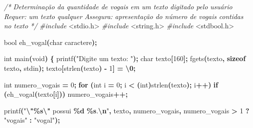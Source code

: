 \documentclass[
  11pt,
  a4paper,
]{scrbook}
\newenvironment{Shaded}{\begin{snugshade}}{\end{snugshade}}
\newcommand{\CharTok}[1]{\textcolor[rgb]{0.31,0.60,0.02}{#1}}
\newcommand{\CommentTok}[1]{\textcolor[rgb]{0.56,0.35,0.01}{\textit{#1}}}
\newcommand{\ControlFlowTok}[1]{\textcolor[rgb]{0.13,0.29,0.53}{\textbf{#1}}}
\newcommand{\DataTypeTok}[1]{\textcolor[rgb]{0.13,0.29,0.53}{#1}}
\newcommand{\DecValTok}[1]{\textcolor[rgb]{0.00,0.00,0.81}{#1}}
\newcommand{\ImportTok}[1]{#1}
\newcommand{\KeywordTok}[1]{\textcolor[rgb]{0.13,0.29,0.53}{\textbf{#1}}}
\newcommand{\NormalTok}[1]{#1}
\newcommand{\OperatorTok}[1]{\textcolor[rgb]{0.81,0.36,0.00}{\textbf{#1}}}
\newcommand{\PreprocessorTok}[1]{\textcolor[rgb]{0.56,0.35,0.01}{\textit{#1}}}
\newcommand{\SpecialCharTok}[1]{\textcolor[rgb]{0.81,0.36,0.00}{\textbf{#1}}}
\newcommand{\StringTok}[1]{\textcolor[rgb]{0.31,0.60,0.02}{#1}}
\begin{document}
\begin{Shaded}
\begin{Highlighting}[]
\CommentTok{/*}
\CommentTok{Determinação da quantidade de vogais em um texto digitado pelo usuário}
\CommentTok{Requer: um texto qualquer}
\CommentTok{Assegura: apresentação do número de vogais contidas no texto}
\CommentTok{*/}
\PreprocessorTok{\#include }\ImportTok{\textless{}stdio.h\textgreater{}}
\PreprocessorTok{\#include }\ImportTok{\textless{}string.h\textgreater{}}
\PreprocessorTok{\#include }\ImportTok{\textless{}stdbool.h\textgreater{}}

\DataTypeTok{bool}\NormalTok{ eh\_vogal}\OperatorTok{(}\DataTypeTok{char}\NormalTok{ caractere}\OperatorTok{);}

\DataTypeTok{int}\NormalTok{ main}\OperatorTok{(}\DataTypeTok{void}\OperatorTok{)} \OperatorTok{\{}
\NormalTok{    printf}\OperatorTok{(}\StringTok{"Digite um texto: "}\OperatorTok{);}
    \DataTypeTok{char}\NormalTok{ texto}\OperatorTok{[}\DecValTok{160}\OperatorTok{];}
\NormalTok{    fgets}\OperatorTok{(}\NormalTok{texto}\OperatorTok{,} \KeywordTok{sizeof}\NormalTok{ texto}\OperatorTok{,}\NormalTok{ stdin}\OperatorTok{);}
\NormalTok{    texto}\OperatorTok{[}\NormalTok{strlen}\OperatorTok{(}\NormalTok{texto}\OperatorTok{)} \OperatorTok{{-}} \DecValTok{1}\OperatorTok{]} \OperatorTok{=} \CharTok{\textquotesingle{}}\SpecialCharTok{\textbackslash{}0}\CharTok{\textquotesingle{}}\OperatorTok{;}

    \DataTypeTok{int}\NormalTok{ numero\_vogais }\OperatorTok{=} \DecValTok{0}\OperatorTok{;}
    \ControlFlowTok{for} \OperatorTok{(}\DataTypeTok{int}\NormalTok{ i }\OperatorTok{=} \DecValTok{0}\OperatorTok{;}\NormalTok{ i }\OperatorTok{\textless{}} \OperatorTok{(}\DataTypeTok{int}\OperatorTok{)}\NormalTok{strlen}\OperatorTok{(}\NormalTok{texto}\OperatorTok{);}\NormalTok{ i}\OperatorTok{++)}
        \ControlFlowTok{if} \OperatorTok{(}\NormalTok{eh\_vogal}\OperatorTok{(}\NormalTok{texto}\OperatorTok{[}\NormalTok{i}\OperatorTok{]))}
\NormalTok{            numero\_vogais}\OperatorTok{++;}

\NormalTok{    printf}\OperatorTok{(}\StringTok{"}\SpecialCharTok{\textbackslash{}"\%s\textbackslash{}"}\StringTok{ possui }\SpecialCharTok{\%d}\StringTok{ }\SpecialCharTok{\%s}\StringTok{.}\SpecialCharTok{\textbackslash{}n}\StringTok{"}\OperatorTok{,}\NormalTok{ texto}\OperatorTok{,}\NormalTok{ numero\_vogais}\OperatorTok{,}
\NormalTok{           numero\_vogais }\OperatorTok{\textgreater{}} \DecValTok{1} \OperatorTok{?} \StringTok{"vogais"} \OperatorTok{:} \StringTok{"vogal"}\OperatorTok{);}


\end{Highlighting}
\end{Shaded}
\end{document}
